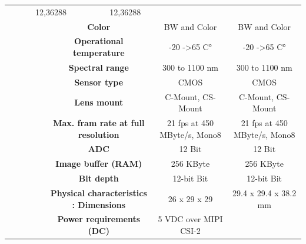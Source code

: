 \begin{table}[H]
{\begin{tabular}{ccc|cc|cc|}
  \multicolumn{2}{c|}{12,36288} &
  \multicolumn{2}{c|}{12,36288} \\
\multicolumn{1}{|c|}{} &
  \multicolumn{2}{c|}{\cellcolor[HTML]{EFEFEF}\textbf{Color}} &
  \multicolumn{2}{c|}{\cellcolor[HTML]{EFEFEF}BW and Color} &
  \multicolumn{2}{c|}{\cellcolor[HTML]{EFEFEF}BW and Color} \\
\multicolumn{1}{|c|}{} &
  \multicolumn{2}{c|}{\textbf{Operational temperature}} &
  \multicolumn{2}{c|}{-20 -\textgreater 65 C°} &
  \multicolumn{2}{c|}{-20 -\textgreater 65 C°} \\
\multicolumn{1}{|c|}{} &
  \multicolumn{2}{c|}{\cellcolor[HTML]{EFEFEF}\textbf{Spectral range}} &
  \multicolumn{2}{c|}{\cellcolor[HTML]{EFEFEF}300 to 1100 nm} &
  \multicolumn{2}{c|}{\cellcolor[HTML]{EFEFEF}300 to 1100 nm} \\
\multicolumn{1}{|c|}{} &
  \multicolumn{2}{c|}{\textbf{Sensor type}} &
  \multicolumn{2}{c|}{CMOS} &
  \multicolumn{2}{c|}{CMOS} \\
\multicolumn{1}{|c|}{} &
  \multicolumn{2}{c|}{\cellcolor[HTML]{EFEFEF}\textbf{Lens mount}} &
  \multicolumn{2}{c|}{\cellcolor[HTML]{EFEFEF}C-Mount, CS-Mount} &
  \multicolumn{2}{c|}{\cellcolor[HTML]{EFEFEF}C-Mount, CS-Mount} \\
\multicolumn{1}{|c|}{} &
  \multicolumn{2}{c|}{\textbf{Max. fram rate at full resolution}} &
  \multicolumn{2}{c|}{21 fps at 450 MByte/s, Mono8} &
  \multicolumn{2}{c|}{21 fps at 450 MByte/s, Mono8} \\
\multicolumn{1}{|c|}{} &
  \multicolumn{2}{c|}{\cellcolor[HTML]{EFEFEF}\textbf{ADC}} &
  \multicolumn{2}{c|}{\cellcolor[HTML]{EFEFEF}12 Bit} &
  \multicolumn{2}{c|}{\cellcolor[HTML]{EFEFEF}12 Bit} \\
\multicolumn{1}{|c|}{} &
  \multicolumn{2}{c|}{\textbf{Image buffer (RAM)}} &
  \multicolumn{2}{c|}{256 KByte} &
  \multicolumn{2}{c|}{256 KByte} \\
\multicolumn{1}{|c|}{} &
  \multicolumn{2}{c|}{\cellcolor[HTML]{EFEFEF}\textbf{Bit depth}} &
  \multicolumn{2}{c|}{\cellcolor[HTML]{EFEFEF}12-bit Bit} &
  \multicolumn{2}{c|}{\cellcolor[HTML]{EFEFEF}12-bit Bit} \\
\multicolumn{1}{|c|}{} &
  \multicolumn{2}{c|}{\textbf{Physical characteristics : Dimensions}} &
  \multicolumn{2}{c|}{26 x 29 x 29} &
  \multicolumn{2}{c|}{29.4 x 29.4 x 38.2 mm} \\
\multicolumn{1}{|c|}{} &
  \multicolumn{2}{c|}{\cellcolor[HTML]{EFEFEF}\textbf{Power requirements (DC)}} &
  \multicolumn{2}{c|}{\cellcolor[HTML]{EFEFEF}5 VDC over MIPI CSI-2} &

\end{tabular}}
\end{table}

